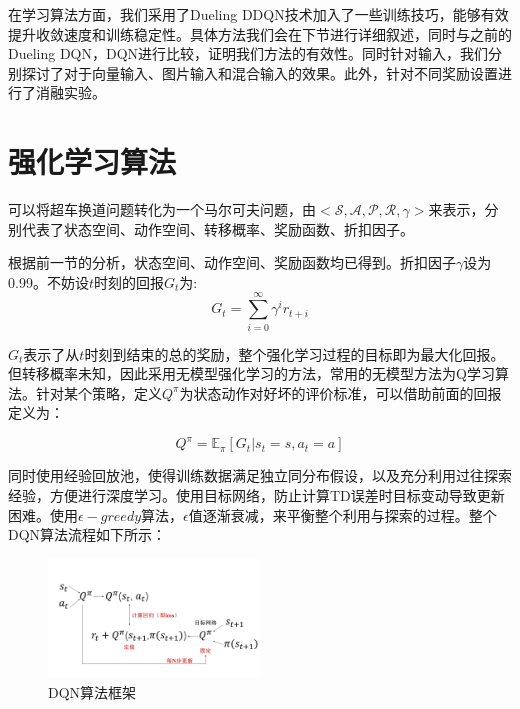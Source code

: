 \documentclass[letterpaper, 10 pt, conference]{ieeeconf}  %
\begin{document}
在学习算法方面，我们采用了Dueling DDQN技术加入了一些训练技巧，能够有效提升收敛速度和训练稳定性。具体方法我们会在下节进行详细叙述，同时与之前的Dueling DQN，DQN进行比较，证明我们方法的有效性。同时针对输入，我们分别探讨了对于向量输入、图片输入和混合输入的效果。此外，针对不同奖励设置进行了消融实验。

\section{强化学习算法}
可以将超车换道问题转化为一个马尔可夫问题，由$<\mathcal{S},\mathcal{A},\mathcal{P},\mathcal{R},\gamma>$来表示，分别代表了状态空间、动作空间、转移概率、奖励函数、折扣因子。

根据前一节的分析，状态空间、动作空间、奖励函数均已得到。折扣因子$\gamma$设为0.99。不妨设$t$时刻的回报$G_t$为:
\begin{equation}
    G_t = \sum^{\infty}_{i=0}\gamma^ir_{t+i}
\end{equation}

$G_t$表示了从$t$时刻到结束的总的奖励，整个强化学习过程的目标即为最大化回报。但转移概率未知，因此采用无模型强化学习的方法，常用的无模型方法为Q学习算法。针对某个策略，定义$Q^\pi$为状态动作对好坏的评价标准，可以借助前面的回报定义为：

\begin{equation}
    Q^\pi = \mathbb{E}_\pi[G_t|s_t=s,a_t=a]
\end{equation}

同时使用经验回放池，使得训练数据满足独立同分布假设，以及充分利用过往探索经验，方便进行深度学习。使用目标网络，防止计算TD误差时目标变动导致更新困难。使用$\epsilon-greedy$算法，$\epsilon$值逐渐衰减，来平衡整个利用与探索的过程。整个DQN算法\cite{mnih2015human}流程如下所示：

\begin{figure}[htbp] %
    \centering %
    \includegraphics[width=0.5\textwidth]{fig/2.JPG} %
    \caption{DQN算法框架\cite{mnih2015human}} %
    \label{Fig.main2} %
\end{figure}
\end{document}
